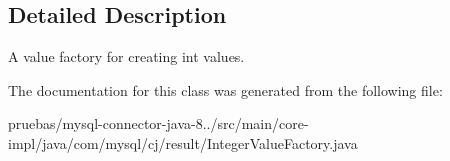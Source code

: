 \subsection{Detailed Description}
A value factory for creating int values. 

The documentation for this class was generated from the following file\+:\begin{DoxyCompactItemize}
\item 
pruebas/mysql-\/connector-\/java-\/8../src/main/core-\/impl/java/com/mysql/cj/result/Integer\+Value\+Factory.\+java\end{DoxyCompactItemize}
